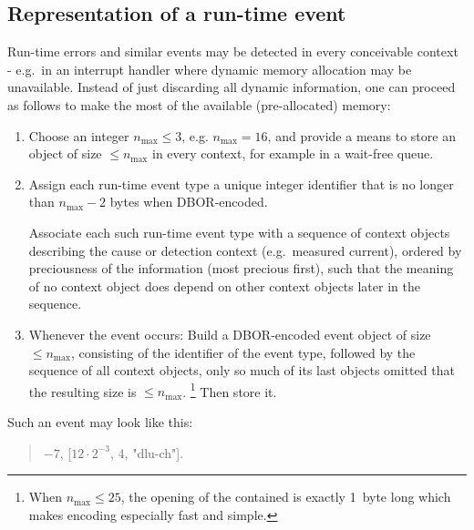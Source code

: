 \subsection{Representation of a run-time event}

Run-time errors and similar events may be detected in every conceivable context -
e.g.\ in an interrupt handler where dynamic memory allocation may be unavailable.
Instead of just discarding all dynamic information, one can proceed as follows to make the most of the available
(pre-allocated) memory:

\begin{enumerate}
    \item
    Choose an integer $n_{\text{max}} \le 3$, e.g. $n_{\text{max}} = 16$, and provide a means to store an object
    of size $\le n_{\text{max}}$ in every context, for example in a wait-free queue.

    \item
    Assign each run-time event type a unique integer identifier that is no longer than $n_{\text{max}} - 2$ bytes
    when DBOR-encoded.

    Associate each such run-time event type with a sequence of context objects describing the cause or detection context
    (e.g.\ measured current), ordered by preciousness of the information (most precious first), such that the meaning
    of no context object does depend on other context objects later in the sequence.

    \item
    Whenever the event occurs:
    Build a DBOR-encoded event object of size $\le n_{\text{max}}$, consisting of the identifier of the event type,
    followed by the sequence of all context objects, only so much of its last objects
    omitted that the resulting size is $\le n_{\text{max}}$.%
    \footnote{%
        When $n_{\text{max}} \le 25$, the opening \DborIntegerToken{} of the contained \DborSequenceValue{}
        is exactly 1~byte long which makes encoding especially fast and simple.
    }
    Then store it.
\end{enumerate}

\begin{BeginParPenalty}
    Such an event may look like this:
    \begin{quote}
        $-7$, [$12 \cdot 2^{-3}$, $4$, "dlu-ch"].
    \end{quote}
\end{BeginParPenalty}

